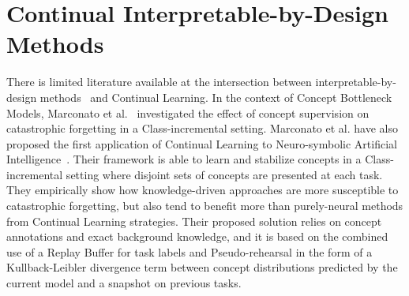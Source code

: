 \section{Continual Interpretable-by-Design Methods} There is limited literature available at the intersection between interpretable-by-design methods~\cite{rudin2022interpretable} and Continual Learning.
In the context of Concept Bottleneck Models, Marconato et al.~\cite{marconato2022catastrophic} investigated the effect of concept supervision on catastrophic forgetting in a Class-incremental setting. %
Marconato et al. have also proposed the first application of Continual Learning to Neuro-symbolic Artificial Intelligence~\cite{marconato2023neuro}. Their framework is able to learn and stabilize concepts in a Class-incremental setting where disjoint sets of concepts are presented at each task. They empirically show how knowledge-driven approaches are more susceptible to catastrophic forgetting, but also tend to benefit more than purely-neural methods from Continual Learning strategies. %
Their proposed solution relies on concept annotations and exact background knowledge, and it is based on the combined use of a Replay Buffer for task labels and Pseudo-rehearsal in the form of a Kullback-Leibler divergence term between concept distributions predicted by the current model and a snapshot on previous tasks. %
